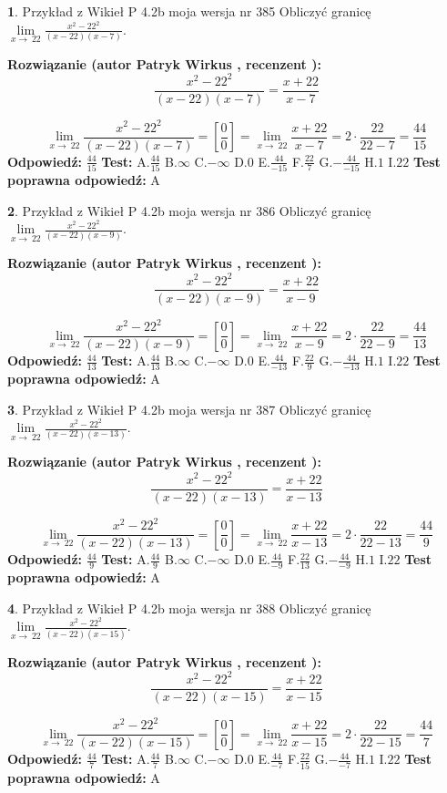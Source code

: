\documentclass[12pt, a4paper]{article}
\theoremstyle{definition} %
\newtheorem{zad}{}
\newcommand{\zadStart}[1]{\begin{zad}#1\newline}
\newcommand{\zadStop}{\end{zad}}
\newcommand{\rozwStart}[2]{\noindent \textbf{Rozwiązanie (autor #1 , recenzent #2): }\newline}
\newcommand{\rozwStop}{\newline}
\newcommand{\odpStart}{\noindent \textbf{Odpowiedź:}\newline}
\newcommand{\odpStop}{\newline}
\newcommand{\testStart}{\noindent \textbf{Test:}\newline}
\newcommand{\testStop}{\newline}
\newcommand{\kluczStart}{\noindent \textbf{Test poprawna odpowiedź:}\newline}
\newcommand{\kluczStop}{\newline}
\begin{document}
\zadStart{Przykład z Wikieł P 4.2b moja wersja nr 385}
Obliczyć granicę $\lim\limits_{x\to\ 22}\frac{x^{2}-22^{2}}{(x-22)(x-7)}$.
\zadStop
\rozwStart{Patryk Wirkus}{}
$$\frac{x^{2}-22^{2}}{(x-22)(x-7)}=\frac{x+22}{x-7}$$

$$\lim\limits_{x\to\ 22}\frac{x^{2}-22^{2}}{(x-22)(x-7)}=[\frac{0}{0}]=\lim\limits_{x\to\ 22}\frac{x+22}{x-7}=2 \cdot \frac{22}{22-7} = \frac{44}{15}$$
\rozwStop
\odpStart
$\frac{44}{15}$
\odpStop
\testStart
A.$\frac{44}{15}$
B.$\infty$
C.$-\infty$
D.$0$
E.$\frac{44}{-15}$
F.$\frac{22}{7}$
G.$-\frac{44}{-15}$
H.$1$
I.$22$
\testStop
\kluczStart
A
\kluczStop



\zadStart{Przykład z Wikieł P 4.2b moja wersja nr 386}
Obliczyć granicę $\lim\limits_{x\to\ 22}\frac{x^{2}-22^{2}}{(x-22)(x-9)}$.
\zadStop
\rozwStart{Patryk Wirkus}{}
$$\frac{x^{2}-22^{2}}{(x-22)(x-9)}=\frac{x+22}{x-9}$$

$$\lim\limits_{x\to\ 22}\frac{x^{2}-22^{2}}{(x-22)(x-9)}=[\frac{0}{0}]=\lim\limits_{x\to\ 22}\frac{x+22}{x-9}=2 \cdot \frac{22}{22-9} = \frac{44}{13}$$
\rozwStop
\odpStart
$\frac{44}{13}$
\odpStop
\testStart
A.$\frac{44}{13}$
B.$\infty$
C.$-\infty$
D.$0$
E.$\frac{44}{-13}$
F.$\frac{22}{9}$
G.$-\frac{44}{-13}$
H.$1$
I.$22$
\testStop
\kluczStart
A
\kluczStop



\zadStart{Przykład z Wikieł P 4.2b moja wersja nr 387}
Obliczyć granicę $\lim\limits_{x\to\ 22}\frac{x^{2}-22^{2}}{(x-22)(x-13)}$.
\zadStop
\rozwStart{Patryk Wirkus}{}
$$\frac{x^{2}-22^{2}}{(x-22)(x-13)}=\frac{x+22}{x-13}$$

$$\lim\limits_{x\to\ 22}\frac{x^{2}-22^{2}}{(x-22)(x-13)}=[\frac{0}{0}]=\lim\limits_{x\to\ 22}\frac{x+22}{x-13}=2 \cdot \frac{22}{22-13} = \frac{44}{9}$$
\rozwStop
\odpStart
$\frac{44}{9}$
\odpStop
\testStart
A.$\frac{44}{9}$
B.$\infty$
C.$-\infty$
D.$0$
E.$\frac{44}{-9}$
F.$\frac{22}{13}$
G.$-\frac{44}{-9}$
H.$1$
I.$22$
\testStop
\kluczStart
A
\kluczStop



\zadStart{Przykład z Wikieł P 4.2b moja wersja nr 388}
Obliczyć granicę $\lim\limits_{x\to\ 22}\frac{x^{2}-22^{2}}{(x-22)(x-15)}$.
\zadStop
\rozwStart{Patryk Wirkus}{}
$$\frac{x^{2}-22^{2}}{(x-22)(x-15)}=\frac{x+22}{x-15}$$

$$\lim\limits_{x\to\ 22}\frac{x^{2}-22^{2}}{(x-22)(x-15)}=[\frac{0}{0}]=\lim\limits_{x\to\ 22}\frac{x+22}{x-15}=2 \cdot \frac{22}{22-15} = \frac{44}{7}$$
\rozwStop
\odpStart
$\frac{44}{7}$
\odpStop
\testStart
A.$\frac{44}{7}$
B.$\infty$
C.$-\infty$
D.$0$
E.$\frac{44}{-7}$
F.$\frac{22}{15}$
G.$-\frac{44}{-7}$
H.$1$
I.$22$
\testStop
\kluczStart
A
\kluczStop
\end{document}
